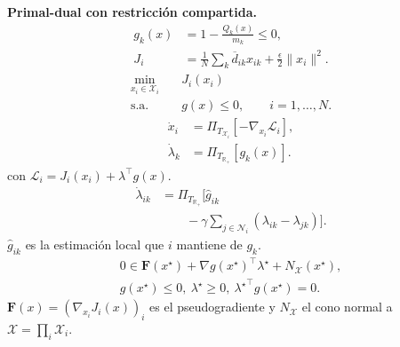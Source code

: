 \begin{minipage}[t]{.49\linewidth}
\textbf{Primal-dual con restricción compartida.}
\begin{equation}
\begin{aligned}
g_k(x)&=1-\frac{Q_k(x)}{m_k}\le0,\\[-1mm]
J_i&=\frac1N\sum_k\overline{d}_{ik}x_{ik}+\frac\epsilon2\|x_i\|^2 .
\end{aligned}
\tag{9}
\end{equation}
\begin{equation}
\begin{aligned}
\min_{x_i\in\mathcal X_i}\quad&J_i(x_i)\\[-1mm]
\mathrm{s.a.}\quad&g(x)\le0,\qquad i=1,\ldots,N .
\end{aligned}
\tag{10}
\end{equation}
\begin{equation}
\begin{aligned}
\dot x_i&=\Pi_{T_{\mathcal X_i}}[-\nabla_{x_i}\mathcal L_i],\\[-1mm]
\dot\lambda_k&=\Pi_{T_{\mathbb R_+}}[g_k(x)] .
\end{aligned}
\tag{11}
\label{eq:n4-primal-dual}
\end{equation}
con $\mathcal L_i=J_i(x_i)+\lambda^{\!\top}g(x)$.
\begin{equation}
\begin{aligned}
\dot\lambda_{ik}&=\Pi_{T_{\mathbb R_+}}
\!\bigl[\widehat g_{ik}\\[-1mm]
&\qquad-\gamma\!\sum_{j\in\mathcal N_i}
(\lambda_{ik}-\lambda_{jk})\bigr].
\end{aligned}
\tag{12}
\label{eq:n4-consensus}
\end{equation}
$\widehat g_{ik}$ es la estimación local que $i$ mantiene de $g_k$.
\begin{equation}
\label{eq:n4-kkt}
\begin{gathered}
0\in\mathbf F(x^\star)+\nabla g(x^\star)^\top\lambda^\star
+N_{\mathcal X}(x^\star),\\
g(x^\star)\le0,\ \lambda^\star\ge0,\ 
{\lambda^\star}^{\!\top}g(x^\star)=0 .
\end{gathered}
\tag{13}
\end{equation}
$\mathbf F(x)=(\nabla_{x_i}J_i(x))_{i}$ es el pseudogradiente y $N_{\mathcal X}$ el
cono normal a $\mathcal X=\prod_i\mathcal X_i$.
\end{minipage}


